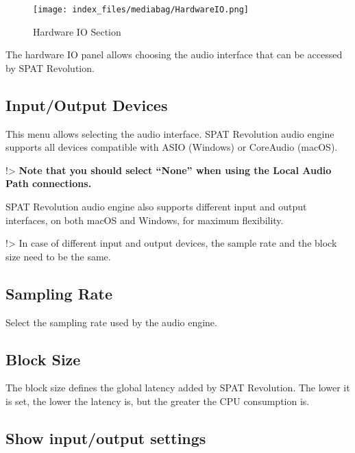 \documentclass[
  letterpaper,
  DIV=11,
  numbers=noendperiod]{scrreport}
\begin{document}
\begin{figure}

{\centering \texttt{[image: index\_files/mediabag/HardwareIO.png]}

}

\caption{Hardware IO Section}

\end{figure}

The hardware IO panel allows choosing the audio interface that can be
accessed by SPAT Revolution.

\hypertarget{inputoutput-devices}{%
\subsection{Input/Output Devices}\label{inputoutput-devices}}

This menu allows selecting the audio interface. SPAT Revolution audio
engine supports all devices compatible with ASIO (Windows) or CoreAudio
(macOS).

!\textgreater{} \textbf{Note that you should select ``None'' when using
the Local Audio Path connections.}

SPAT Revolution audio engine also supports different input and output
interfaces, on both macOS and Windows, for maximum flexibility.

!\textgreater{} In case of different input and output devices, the
sample rate and the block size need to be the same.

\hypertarget{sampling-rate}{%
\subsection{Sampling Rate}\label{sampling-rate}}

Select the sampling rate used by the audio engine.

\hypertarget{block-size}{%
\subsection{Block Size}\label{block-size}}

The block size defines the global latency added by SPAT Revolution. The
lower it is set, the lower the latency is, but the greater the CPU
consumption is.

\hypertarget{show-inputoutput-settings}{%
\subsection{Show input/output
settings}\label{show-inputoutput-settings}}
\end{document}
